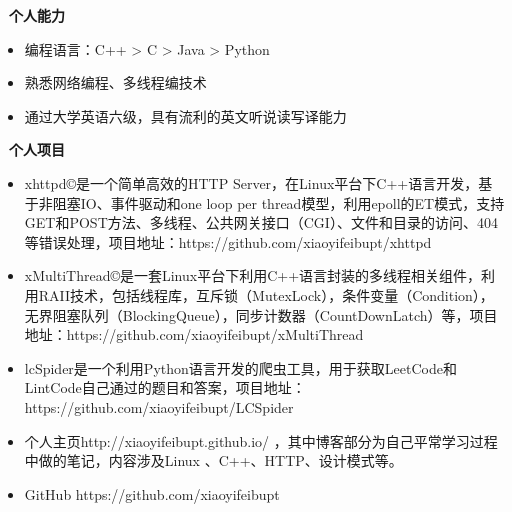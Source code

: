 \documentclass[UTF8, winfonts]{ctexart}
\begin{document}
\noindent \textbf{ \heiti \faCogs\ 个人能力}
\begin{itemize}
  \setlength{\itemsep}{0pt}
  \setlength{\parsep}{3pt}
  \setlength{\parskip}{3pt}
  \item {}编程语言：C++ > C > Java > Python
  \item {}熟悉网络编程、多线程编技术
  \item {}通过大学英语六级，具有流利的英文听说读写译能力
\end{itemize}
\noindent \textbf{ \heiti \faCode\ 个人项目}
\begin{itemize}
  \setlength{\itemsep}{0pt}
  \setlength{\parsep}{3pt}
  \setlength{\parskip}{3pt}
  \item {}xhttpd©是一个简单高效的HTTP Server，在Linux平台下C++语言开发，基于非阻塞IO、事件驱动和one loop per thread模型，利用epoll的ET模式，支持GET和POST方法、多线程、公共网关接口（CGI）、文件和目录的访问、404等错误处理，项目地址：https://github.com/xiaoyifeibupt/xhttpd
  \item {}xMultiThread©是一套Linux平台下利用C++语言封装的多线程相关组件，利用RAII技术，包括线程库，互斥锁（MutexLock），条件变量（Condition），无界阻塞队列（BlockingQueue），同步计数器（CountDownLatch）等，项目地址：https://github.com/xiaoyifeibupt/xMultiThread
  \item {}lcSpider是一个利用Python语言开发的爬虫工具，用于获取LeetCode和LintCode自己通过的题目和答案，项目地址：https://github.com/xiaoyifeibupt/LCSpider
  \item {}个人主页http://xiaoyifeibupt.github.io/ ，其中博客部分为自己平常学习过程中做的笔记，内容涉及Linux 、C++、HTTP、设计模式等。
  \item {}GitHub https://github.com/xiaoyifeibupt
\end{itemize}
\end{document}
